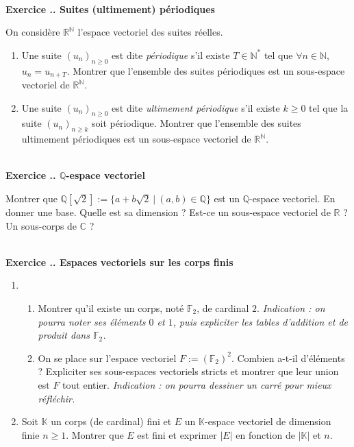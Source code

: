 \documentclass{article}
\newcommand{\mb}[1]{\mathbb{#1}}
\newcounter{exo}
\newcommand{\exercice}[1][\null]{\textbf{\\ Exercice \thesection.\theexo. #1} \addtocounter{exo}{1}}
\begin{document}
\exercice[Suites (ultimement) périodiques]

On considère $\mb{R}^{\mb{N}}$ l'espace vectoriel des suites réelles. 
\begin{enumerate}

\item Une suite $(u_n)_{n \ge 0}$ est dite \emph{périodique} s'il existe $T \in \mb{N}^*$ tel que $\forall n \in \mb{N}$, $u_{n} = u_{n+T}$. Montrer que l'ensemble des suites périodiques est un sous-espace vectoriel de $\mb{R}^{\mb{N}}$.

\item Une suite $(u_n)_{n \ge 0}$ est dite \emph{ultimement périodique} s'il existe $k \ge 0$ tel que la suite $(u_n)_{n \ge k}$ soit périodique. Montrer que l'ensemble des suites ultimement périodiques est un sous-espace vectoriel de $\mb{R}^{\mb{N}}$.

\end{enumerate}

\exercice[$\mb{Q}$-espace vectoriel]

Montrer que $\mb{Q}[\sqrt{2}] := \{ a + b\sqrt{2} ~|~ (a,b) \in \mb{Q} \}$ est un $\mb{Q}$-espace vectoriel. En donner une base. Quelle est sa dimension ? Est-ce un sous-espace vectoriel de $\mb{R}$ ? Un sous-corps de $\mb{C}$ ?

\exercice[Espaces vectoriels sur les corps finis]

\begin{enumerate}

\item \begin{enumerate} \item Montrer qu'il existe un corps, noté $\mb{F}_2$, de cardinal $2$. \emph{Indication : on pourra noter ses éléments $0$ et $1$, puis expliciter les tables d'addition et de produit dans $\mb{F}_2$.}

\item On se place sur l'espace vectoriel $F := (\mb{F}_2)^2$. Combien a-t-il d'éléments ? Expliciter ses sous-espaces vectoriels stricts et montrer que leur union est $F$ tout entier. \emph{Indication : on pourra dessiner un carré pour mieux réfléchir.}

\end{enumerate}


\item Soit $\mb{K}$ un corps (de cardinal) fini et $E$ un $\mb{K}$-espace vectoriel de dimension finie $n \ge 1$. Montrer que $E$ est fini et exprimer $|E|$ en fonction de $|\mb{K}|$ et $n$.


\end{enumerate}
\end{document}
